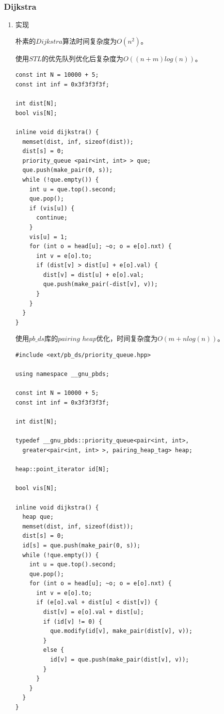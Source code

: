 \documentclass[11pt]{article}
\begin{document}
\subsubsection{Dijkstra}
\label{sec:org386ca5a}
\begin{enumerate}
\item 实现
\label{sec:orgd13cb52}

朴素的\(Dijkstra\)算法时间复杂度为\(O(n^2)\)。

使用\(STL\)的优先队列优化后复杂度为\(O((n+m)log(n))\)。

\begin{verbatim}
const int N = 10000 + 5;
const int inf = 0x3f3f3f3f;

int dist[N];
bool vis[N];

inline void dijkstra() {
  memset(dist, inf, sizeof(dist));
  dist[s] = 0;
  priority_queue <pair<int, int> > que;
  que.push(make_pair(0, s));
  while (!que.empty()) {
    int u = que.top().second;
    que.pop();
    if (vis[u]) {
      continue;
    }
    vis[u] = 1;
    for (int o = head[u]; ~o; o = e[o].nxt) {
      int v = e[o].to;
      if (dist[v] > dist[u] + e[o].val) {
        dist[v] = dist[u] + e[o].val;
        que.push(make_pair(-dist[v], v));
      }
    }
  }
}
\end{verbatim}


使用\(pb\_ds\)库的\(pairing\) \(heap\)优化，时间复杂度为\(O(m+nlog(n))\)。

\begin{verbatim}
#include <ext/pb_ds/priority_queue.hpp>

using namespace __gnu_pbds;

const int N = 10000 + 5;
const int inf = 0x3f3f3f3f;

int dist[N];

typedef __gnu_pbds::priority_queue<pair<int, int>, 
  greater<pair<int, int> >, pairing_heap_tag> heap;

heap::point_iterator id[N];

bool vis[N];

inline void dijkstra() {
  heap que;
  memset(dist, inf, sizeof(dist));
  dist[s] = 0;
  id[s] = que.push(make_pair(0, s));
  while (!que.empty()) {
    int u = que.top().second;
    que.pop();
    for (int o = head[u]; ~o; o = e[o].nxt) {
      int v = e[o].to;
      if (e[o].val + dist[u] < dist[v]) {
        dist[v] = e[o].val + dist[u];
        if (id[v] != 0) {
          que.modify(id[v], make_pair(dist[v], v));
        }
        else {
          id[v] = que.push(make_pair(dist[v], v));
        }
      }
    }
  }
}
\end{verbatim}
\end{enumerate}
\end{document}
